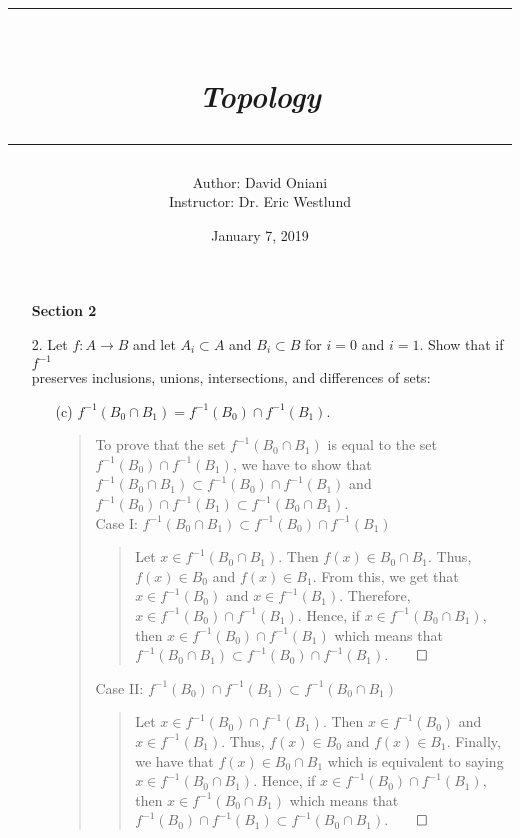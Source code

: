 \documentclass[12pt, a4paper]{article}
\title{\rule{\paperwidth - 150pt}{1pt}\textbf{\\\textit{Topology}\\}\rule{\paperwidth - 150pt}{1pt}}
\author
{
Author: David Oniani\\
Instructor: Dr. Eric Westlund
}
\date{January 7, 2019}
\newcommand{\rarr}{\rightarrow}
\begin{document}
\maketitle


\begin{itemize}
\item[]
\item[]
{\large \textbf{Section 2}}
\vspace{0.3cm}


\item[2.]
Let $f : A \rarr B$ and let $A_i \subset A$ and $B_i \subset B$
for $i = 0$ and $i = 1$. Show that if $f^{-1}$\\
preserves inclusions, unions, intersections, and differences of sets:

\begin{itemize}
\item[(c)]
$f^{-1}(B_0 \cap B_1) = f^{-1}(B_0) \cap f^{-1}(B_1)$.
\vspace{0.25cm}

\begin{quote}
To prove that the set $f^{-1}(B_0 \cap B_1)$
is equal to the set $f^{-1}(B_0) \cap f^{-1}(B_1)$,
we have to show that $f^{-1}(B_0 \cap B_1) \subset f^{-1}(B_0) \cap f^{-1}(B_1)$
and $f^{-1}(B_0) \cap f^{-1}(B_1) \subset f^{-1}(B_0 \cap B_1)$.
\\
\vspace{0.5cm}
Case I: $f^{-1}(B_0 \cap B_1) \subset f^{-1}(B_0) \cap f^{-1}(B_1)$\\
\vspace{0.15cm}

\begin{quote}
Let $x \in f^{-1}(B_0 \cap B_1)$. Then $f(x) \in B_0 \cap B_1$. Thus, $f(x) \in B_0$
and $f(x) \in B_1$. From this, we get that $x \in f^{-1}(B_0)$ and $x \in f^{-1}(B_1)$.
Therefore, $x \in f^{-1}(B_0) \cap f^{-1}(B_1)$. Hence, if $x \in f^{-1}(B_0 \cap B_1)$,
then $x \in f^{-1}(B_0) \cap f^{-1}(B_1)$ which means that $f^{-1}(B_0 \cap B_1) \subset f^{-1}(B_0) \cap f^{-1}(B_1)$.$\qed$
\end{quote}

\vspace{0.5cm}
Case II: $f^{-1}(B_0) \cap f^{-1}(B_1) \subset f^{-1}(B_0 \cap B_1)$\\
\vspace{0.15cm}

\begin{quote}
Let $x \in f^{-1}(B_0) \cap f^{-1}(B_1)$. Then $x \in f^{-1}(B_0)$ and $x \in f^{-1}(B_1)$.
Thus, $f(x) \in B_0$ and $f(x) \in B_1$. Finally, we have that $f(x) \in B_0 \cap B_1$ which
is equivalent to saying $x \in f^{-1}(B_0 \cap B_1)$. Hence, if $x \in f^{-1}(B_0) \cap f^{-1}(B_1)$,
then $x \in f^{-1}(B_0 \cap B_1)$ which means that $f^{-1}(B_0) \cap f^{-1}(B_1) \subset f^{-1}(B_0 \cap B_1)$.$\qed$
\end{quote}
\vspace{0.5cm}


\end{quote}
\end{itemize}
\end{itemize}
\end{document}
